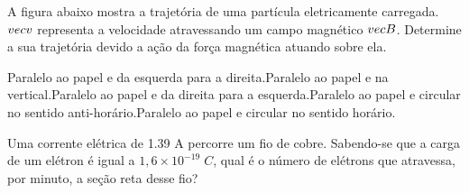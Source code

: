 \documentclass[12pt, addpoints]{exam}
\begin{document}
        \begin{questions}
\begin{multicols*}{2}
\question[20] A ﬁgura abaixo mostra a trajetória de uma partícula eletricamente carregada. $\\vec{{v}}$ representa a velocidade atravessando um campo magnético $\\vec{{B}}$. Determine a sua trajetória devido a ação da força magnética atuando sobre ela.
        
        \begin{center}
            \begin{minipage}[c]{0.5\linewidth}
            \end{minipage}
        \end{center}

        

\begin{choices}
\choice Paralelo ao papel e da esquerda para a direita.\choice Paralelo ao papel e na vertical.\choice Paralelo ao papel e da direita para a esquerda.\choice Paralelo ao papel e circular no sentido anti-horário.\choice Paralelo ao papel e circular no sentido horário.\end{choices}
\question[20] Uma corrente elétrica de    1.39 A percorre um ﬁo de cobre. Sabendo-se que a carga de um elétron é igual a $1,6\times 10^{-19}\;C$, qual é o número de elétrons que atravessa, por minuto, a seção reta desse ﬁo?


\end{multicols*}
\end{questions}
\end{document}
